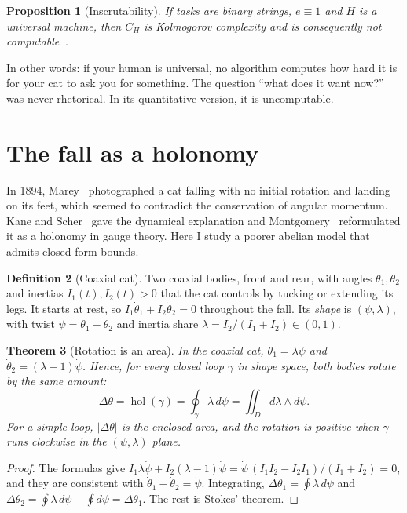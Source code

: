 \documentclass[11pt,a4paper]{article}
\theoremstyle{plain}
\newtheorem{teorema}{Theorem}[section]
\newtheorem{proposicion}[teorema]{Proposition}
\theoremstyle{definition}
\newtheorem{definicion}[teorema]{Definition}
\theoremstyle{remark}
\numberwithin{equation}{section}
\DeclareMathOperator{\hol}{hol}
\newcommand{\cg}{C}
\begin{document}
\begin{proposicion}[Inscrutability]\label{prop:noComputable}
If tasks are binary strings, $e\equiv 1$ and $H$ is a universal machine, then $\cg_H$ is Kolmogorov complexity and is consequently not computable~\cite{livitanyi}.
\end{proposicion}

In other words: if your human is universal, no algorithm computes how hard it is for your cat to ask you for something. The question ``what does it want now?'' was never rhetorical. In its quantitative version, it is uncomputable.

\section{The fall as a holonomy}\label{sec:caida}

In 1894, Marey~\cite{marey,marey-nature} photographed a cat falling with no initial rotation and landing on its feet, which seemed to contradict the conservation of angular momentum. Kane and Scher~\cite{kanescher} gave the dynamical explanation and Montgomery~\cite{montgomery} reformulated it as a holonomy in gauge theory. Here I study a poorer abelian model that admits closed-form bounds.

\begin{definicion}[Coaxial cat]
Two coaxial bodies, front and rear, with angles $\theta_1,\theta_2$ and inertias $I_1(t),I_2(t)>0$ that the cat controls by tucking or extending its legs. It starts at rest, so $I_1\dot\theta_1+I_2\dot\theta_2=0$ throughout the fall. Its \emph{shape} is $(\psi,\lambda)$, with twist $\psi=\theta_1-\theta_2$ and inertia share $\lambda=I_2/(I_1+I_2)\in(0,1)$.
\end{definicion}

\begin{teorema}[Rotation is an area]\label{teo:holonomia}
In the coaxial cat, $\dot\theta_1=\lambda\dot\psi$ and $\dot\theta_2=(\lambda-1)\dot\psi$. Hence, for every closed loop $\gamma$ in shape space, both bodies rotate by the same amount:
\begin{equation}
  \Delta\theta=\hol(\gamma)=\oint_\gamma\lambda\,d\psi=\iint_{D}d\lambda\wedge d\psi .
\end{equation}
For a simple loop, $|\Delta\theta|$ is the enclosed area, and the rotation is positive when $\gamma$ runs clockwise in the $(\psi,\lambda)$ plane.
\end{teorema}

\begin{proof}
The formulas give $I_1\lambda\dot\psi+I_2(\lambda-1)\dot\psi=\dot\psi\,(I_1I_2-I_2I_1)/(I_1+I_2)=0$, and they are consistent with $\dot\theta_1-\dot\theta_2=\dot\psi$. Integrating, $\Delta\theta_1=\oint\lambda\,d\psi$ and $\Delta\theta_2=\oint\lambda\,d\psi-\oint d\psi=\Delta\theta_1$. The rest is Stokes' theorem.
\end{proof}
\end{document}
